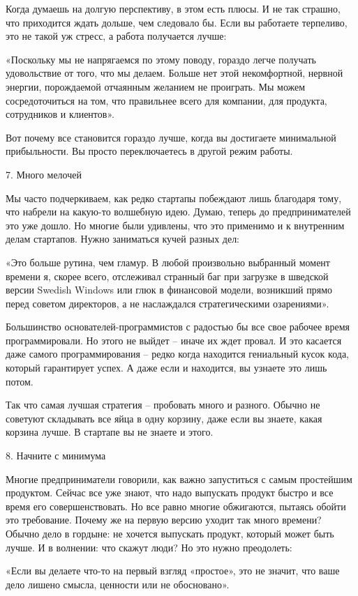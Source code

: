 \documentclass[ebook,12pt,oneside,openany]{memoir}
\begin{document}
Когда думаешь на долгую перспективу, в этом есть плюсы. И не так
страшно, что приходится ждать дольше, чем следовало бы. Если вы
работаете терпеливо, это не такой уж стресс, а работа получается
лучше:

«Поскольку мы не напрягаемся по этому поводу, гораздо легче получать
удовольствие от того, что мы делаем. Больше нет этой некомфортной,
нервной энергии, порождаемой отчаянным желанием не проиграть. Мы можем
сосредоточиться на том, что правильнее всего для компании, для
продукта, сотрудников и клиентов».

Вот почему все становится гораздо лучше, когда вы достигаете
минимальной прибыльности. Вы просто переключаетесь в другой режим
работы.

7. Много мелочей

Мы часто подчеркиваем, как редко стартапы побеждают лишь благодаря
тому, что набрели на какую-то волшебную идею. Думаю, теперь до
предпринимателей это уже дошло. Но многие были удивлены, что это
применимо и к внутренним делам стартапов. Нужно заниматься кучей
разных дел:

«Это больше рутина, чем гламур. В любой произвольно выбранный момент
времени я, скорее всего, отслеживал странный баг при загрузке в
шведской версии Swedish Windows или глюк в финансовой модели,
возникший прямо перед советом директоров, а не наслаждался
стратегическими озарениями».

Большинство основателей-программистов с радостью бы все свое рабочее
время программировали. Но этого не выйдет – иначе их ждет провал. И
это касается даже самого программирования – редко когда находится
гениальный кусок кода, который гарантирует успех. А даже если и
находится, вы узнаете это лишь потом.

Так что самая лучшая стратегия – пробовать много и разного. Обычно не
советуют складывать все яйца в одну корзину, даже если вы знаете,
какая корзина лучше. В стартапе вы не знаете и этого.

8. Начните с минимума

Многие предприниматели говорили, как важно запуститься с самым
простейшим продуктом. Сейчас все уже знают, что надо выпускать продукт
быстро и все время его совершенствовать. Но все равно многие
обжигаются, пытаясь обойти это требование. Почему же на первую версию
уходит так много времени? Обычно дело в гордыне: не хочется выпускать
продукт, который может быть лучше. И в волнении: что скажут люди? Но
это нужно преодолеть:

«Если вы делаете что-то на первый взгляд «простое», это не значит, что
ваше дело лишено смысла, ценности или не обосновано».
\end{document}
